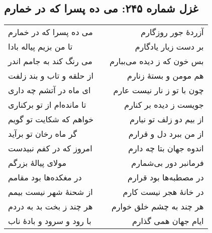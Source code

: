 \begin{center}
\section*{غزل شماره ۲۴۵: می ده پسرا که در خمارم}
\label{sec:245}
\begin{longtable}{l p{0.5cm} r}
می ده پسرا که در خمارم
&&
آزردهٔ جور روزگارم
\\
تا من بزیم پیاله بادا
&&
بر دست زیار یادگارم
\\
می رنگ کند به جامم اندر
&&
بس خون که ز دیده می‌ببارم
\\
از حلقه و تاب و بند زلفت
&&
هم مومن و بستهٔ زنارم
\\
ای ماه در آتشم چه داری
&&
چون با تو ز نار نیست عارم
\\
تا مانده‌ام از تو برکناری
&&
جویست ز دیده بر کنارم
\\
خواهم که شکایت تو گویم
&&
از بیم دو زلف تو نیارم
\\
گر ماه رخان تو برآید
&&
از من ببرد دل و قرارم
\\
امروز که در کفم نبیدست
&&
اندوه جهان بتا چه دارم
\\
مولای پیالهٔ بزرگم
&&
فرمانبر دور بی‌شمارم
\\
در مغکده‌ها بود مقامم
&&
در مصطبه‌ها بود قرارم
\\
از شحنهٔ شهر نیست بیمم
&&
در خانهٔ هجر نیست کارم
\\
هر چند ز بخت بد به دردم
&&
هر چند به چشم خلق خوارم
\\
با رود و سرود و بادهٔ ناب
&&
ایام جهان همی گذارم
\\
\end{longtable}
\end{center}
